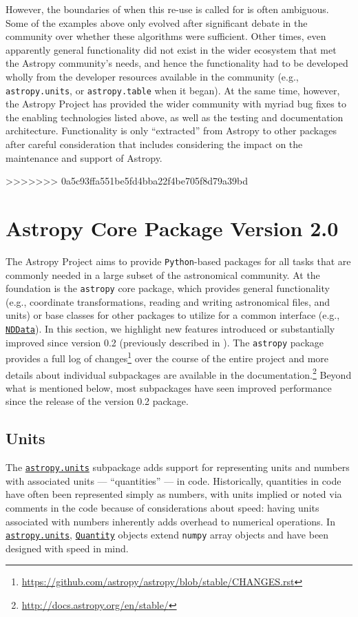\documentclass[modern]{aastex62}
\newcommand{\package}[1]{\texttt{#1}\xspace}
\newcommand{\python}{\package{Python}}
\newcommand{\astropy}{Astropy\xspace}
\newcommand{\astropypkg}{\package{astropy}}
\newcommand{\astropysubpkg}[1]{\href{http://docs.astropy.org/en/stable/#1/index.html}{\texttt{astropy.#1}}\xspace}
\newcommand{\astropyQuantity}{\href{http://docs.astropy.org/en/stable/api/astropy.units.Quantity.html}{\texttt{Quantity}}\xspace}
\begin{document}
However, the boundaries of when this re-use is called for is often ambiguous.  Some
of the examples above only evolved after significant debate in the community
over whether these algorithms were sufficient.  Other times, even apparently
general functionality did not exist in the wider ecosystem that met the \astropy
community's needs, and hence the functionality had to be developed wholly from
the developer resources available in the community (e.g.,
\package{astropy.units}, or \package{astropy.table} when it began). At the same 
time, however, the \astropy Project has provided the wider community with myriad bug
fixes to the enabling technologies listed above, as well as the testing and
documentation architecture. Functionality is only ``extracted'' from \astropy to 
other packages after careful consideration that includes considering the impact 
on the maintenance and support of \astropy.


>>>>>>> 0a5c93ffa551be5fd4bba22f4be705f8d79a39bd

\section{Astropy Core Package Version 2.0}
\label{sec:core}
The \astropy Project aims to provide \python-based packages for all tasks that
are commonly needed in a large subset of the astronomical community.
At the foundation is the \astropypkg core package, which provides general
functionality (e.g., coordinate transformations, reading and writing
astronomical files, and units) or base classes for other
packages to utilize for a common interface (e.g.,
\href{http://docs.astropy.org/en/stable/nddata/index.html}{\texttt{NDData}}).
In this section, we highlight new features introduced or substantially improved
since version 0.2 (previously described in \citealt{astropy}).  The \astropypkg
package
provides a full log of changes\footnote{\url{https://github.com/astropy/astropy/blob/stable/CHANGES.rst}}
over the course of the entire project and more details about individual
subpackages are available in the documentation.\footnote{\url{http://docs.astropy.org/en/stable/}}
Beyond what is mentioned below, most subpackages have seen improved performance
since the release of the version 0.2 package.

\subsection{Units}\label{sec:units}

The \astropysubpkg{units} subpackage adds support for representing units and
numbers with associated units --- ``quantities'' --- in code.
Historically, quantities in code have often been represented simply as numbers,
with units implied or noted via comments in the code because of considerations
about speed: having units associated with numbers inherently adds overhead to
numerical operations.
In \astropysubpkg{units}, \astropyQuantity objects extend \texttt{numpy}
array objects and have been designed with speed in mind.
\end{document}

